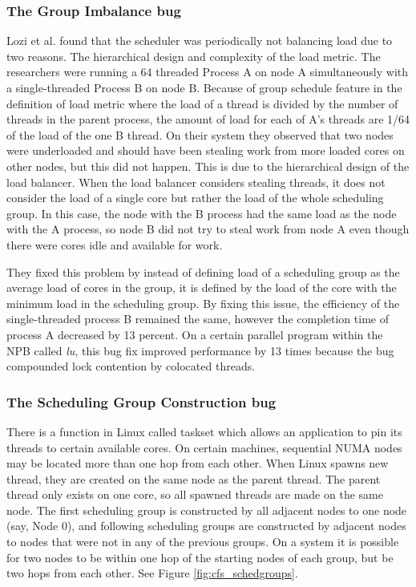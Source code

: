 \documentclass{sig-alternate}
\begin{document}
\subsubsection{The Group Imbalance bug}
\label{sec:cfsfault_grpimbalance}

Lozi et al. found that the scheduler was periodically not balancing load due to two reasons. The hierarchical design and complexity of the load metric. The researchers were running a 64 threaded  Process A on node A simultaneously with a single-threaded Process B on node B. Because of group schedule feature in the definition of load metric where the load of a thread is divided by the number of threads in the parent process, the amount of load for each of A's threads are 1/64 of the load of the one B thread. On their system they observed that two nodes were underloaded and should have been stealing work from more loaded cores on other nodes, but this did not happen. This is due to the hierarchical design of the load balancer. When the load balancer considers stealing threads, it does not consider the load of a single core but rather the load of the whole scheduling group. In this case, the node with the B process had the same load as the node with the A process, so node B did not try to steal work from node A even though there were cores idle and available for work.~\cite{Lozi:2016}

They fixed this problem by instead of defining load of a scheduling group as the average load of cores in the group, it is defined by the load of the core with the minimum load in the scheduling group. By fixing this issue, the efficiency of the single-threaded process B remained the same, however the completion time of process A decreased by 13 percent. On a certain parallel program within the NPB called \textit{lu}, this bug fix improved performance by 13 times because the bug compounded lock contention by colocated threads.~\cite{Lozi:2016}

\subsubsection{The Scheduling Group Construction bug}
\label{sec:cfsfault_grpconstruct}

There is a function in Linux called taskset which allows an application to pin its threads to certain available cores. On certain machines, sequential NUMA nodes may be located more than one hop from each other. When Linux spawns new thread, they are created on the same node as the parent thread. The parent thread only exists on one core, so all spawned threads are made on the same node. The first scheduling group is constructed by all adjacent nodes to one node (say, Node 0), and following scheduling groups are constructed by adjacent nodes to nodes that were not in any of the previous groups. On a system it is possible for two nodes to be within one hop of the starting nodes of each group, but be two hops from each other. See Figure \ref{fig:cfs_schedgroups}.~\cite{Lozi:2016}
\end{document}

